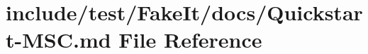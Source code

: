 \hypertarget{Quickstart-MSC_8md}{}\section{include/test/\+Fake\+It/docs/\+Quickstart-\/\+M\+SC.md File Reference}
\label{Quickstart-MSC_8md}

